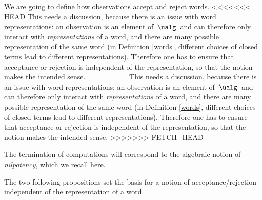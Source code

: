 We are going to define how observations accept and reject words.
<<<<<<< HEAD
This needs a discussion, because there is an issue with word representations: an observation is an element of $\,\ualg\,$ and can therefore only interact with \emph{representations} of a word, and there are many possible representation of the same word (in Definition \ref{words}, different choices of closed terms lead to different representations). Therefore one has to ensure that acceptance or rejection is independent of the representation, so that the notion makes the intended sense.
=======
This needs a discussion, because there is an issue with word representations: an observation is an element of $\,\ualg\,$ and can therefore only interact with \emph{representations} of a word, and there are many possible representation of the same word (in Definition \ref{words}, different choices of closed terms lead to different representations).
Therefore one has to ensure that acceptance or rejection is independent of the representation, so that the notion makes the intended sense.
>>>>>>> FETCH_HEAD

The termination of computations will correspond to the algebraic notion of \emph{nilpotency}, which we recall here.




\smallskip
{}

The two following propositions set the basis for a notion of acceptance/rejection independent of the representation of a word.

